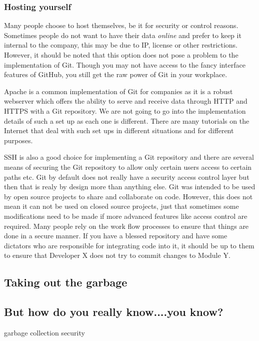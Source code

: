 \subsubsection{Hosting yourself}
Many people choose to host themselves, be it for security or control reasons.
Sometimes people do not want to have their data \emph{online} and prefer to keep it internal to the company, this may be due to IP, license or other restrictions.
However, it should be noted that this option does not pose a problem to the implementation of Git.
Though you may not have access to the fancy interface features of GitHub, you still get the raw power of Git in your workplace.

Apache is a common implementation of Git for companies as it is a robust webserver which offers the ability to serve and receive data through HTTP and HTTPS with a Git repository.
We are not going to go into the implementation details of such a set up as each one is different.
There are many tutorials on the Internet that deal with such set ups in different situations and for different purposes.

SSH is also a good choice for implementing a Git repository and there are several means of securing the Git repository to allow only certain users access to certain paths etc.
Git by default does not really have a security access control layer but then that is realy by design more than anything else.
Git was intended to be used by open source projects to share and collaborate on code.
However, this does not mean it can not be used on closed source projects, just that sometimes some modifications need to be made if more advanced features like access control are required.
Many people rely on the work flow processes to ensure that things are done in a secure manner.
If you have a blessed repository and have some dictators who are responsible for integrating code into it, it should be up to them to ensure that Developer X does not try to commit changes to Module Y.

\subsection{Taking out the garbage}

\subsection{But how do you really know....you know?}

garbage collection
security
